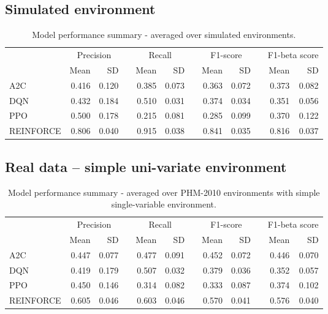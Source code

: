 \documentclass[a4paper, 12pt]{article}
\newcommand{\rowspace}[1]{\renewcommand{\arraystretch}{#1}}
\begin{document}
\subsection{Simulated environment}
\begin{table}[hbt!]\centering\sffamily
	\rowspace{1.3}
	\begin{tabular}{@{}l rr c rr c rr c rr@{}}
		\arrayrulecolor{black!40}\toprule
		& \multicolumn{2}{c}{Precision} & \phantom{i} & \multicolumn{2}{c}{Recall} & \phantom{i} & \multicolumn{2}{c}{F1-score} & \phantom{i} & \multicolumn{2}{c}{F1-beta score} \\
		\cmidrule{2-3} \cmidrule{5-6} \cmidrule{8-9} \cmidrule{11-12} 
		
		&Mean &SD & &Mean &SD & &Mean &SD& &Mean & SD\\ \midrule
		A2C & 0.416 & 0.120 & &0.385 & 0.073 & & 0.363 & 0.072 & &0.373 &0.082 \\
		DQN & 0.432 & 0.184 & &0.510 & 0.031 & & 0.374 & 0.034 & &0.351 &0.056 \\
		PPO & 0.500 & 0.178 & &0.215 & 0.081 & & 0.285 & 0.099 & &0.370 &0.122 \\
		REINFORCE & 0.806 & 0.040 & &0.915 & 0.038 & & 0.841 & 0.035 & &0.816 &0.037 \\
		
		
		\bottomrule
	\end{tabular}
	\caption{Model performance summary - averaged over simulated environments.}
	\label{tbl:SimulatedEnv}
\end{table}

\newpage
\subsection{Real data -- simple uni-variate environment}
\begin{table}[h]\centering
	\sffamily
	\rowspace{1.3}
	\begin{tabular}{@{}l rr c rr c rr c rr@{}}
		\arrayrulecolor{black!40}\toprule
		& \multicolumn{2}{c}{Precision} & \phantom{i} & \multicolumn{2}{c}{Recall} & \phantom{i} & \multicolumn{2}{c}{F1-score} & \phantom{i} & \multicolumn{2}{c}{F1-beta score} \\
		\cmidrule{2-3} \cmidrule{5-6} \cmidrule{8-9} \cmidrule{11-12} 
		
		&Mean &SD & &Mean &SD & &Mean &SD& &Mean & SD\\ \midrule
		A2C & 0.447 & 0.077 & &0.477 & 0.091 & & 0.452 & 0.072 & &0.446 &0.070 \\
		DQN & 0.419 & 0.179 & &0.507 & 0.032 & & 0.379 & 0.036 & &0.352 &0.057 \\
		PPO & 0.450 & 0.146 & &0.314 & 0.082 & & 0.333 & 0.087 & &0.374 &0.102 \\
		REINFORCE & 0.605 & 0.046 & &0.603 & 0.046 & & 0.570 & 0.041 & &0.576 &0.040 \\
		
		\bottomrule
	\end{tabular}
	\caption{Model performance summary - averaged over PHM-2010 environments with simple single-variable environment.}
	\label{tbl:PHMSS}
\end{table}
\end{document}

